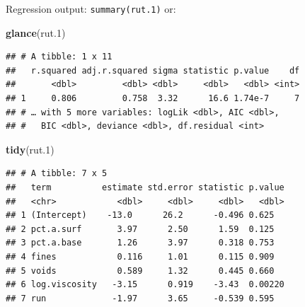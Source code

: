 \documentclass[ignorenonframetext,]{beamer}
\newenvironment{Shaded}{\begin{snugshade}}{\end{snugshade}}
\newcommand{\FloatTok}[1]{\textcolor[rgb]{0.00,0.00,0.81}{#1}}
\newcommand{\KeywordTok}[1]{\textcolor[rgb]{0.13,0.29,0.53}{\textbf{#1}}}
\newcommand{\NormalTok}[1]{#1}
\begin{document}
\begin{frame}[fragile]{Regression output: \texttt{summary(rut.1)} or:}
\protect\hypertarget{regression-output-summaryrut.1-or}{}

\footnotesize

\begin{Shaded}
\begin{Highlighting}[]
\KeywordTok{glance}\NormalTok{(rut}\FloatTok{.1}\NormalTok{)}
\end{Highlighting}
\end{Shaded}

\begin{verbatim}
## # A tibble: 1 x 11
##   r.squared adj.r.squared sigma statistic p.value    df
##       <dbl>         <dbl> <dbl>     <dbl>   <dbl> <int>
## 1     0.806         0.758  3.32      16.6 1.74e-7     7
## # … with 5 more variables: logLik <dbl>, AIC <dbl>,
## #   BIC <dbl>, deviance <dbl>, df.residual <int>
\end{verbatim}

\begin{Shaded}
\begin{Highlighting}[]
\KeywordTok{tidy}\NormalTok{(rut}\FloatTok{.1}\NormalTok{)}
\end{Highlighting}
\end{Shaded}

\begin{verbatim}
## # A tibble: 7 x 5
##   term          estimate std.error statistic p.value
##   <chr>            <dbl>     <dbl>     <dbl>   <dbl>
## 1 (Intercept)    -13.0      26.2      -0.496 0.625  
## 2 pct.a.surf       3.97      2.50      1.59  0.125  
## 3 pct.a.base       1.26      3.97      0.318 0.753  
## 4 fines            0.116     1.01      0.115 0.909  
## 5 voids            0.589     1.32      0.445 0.660  
## 6 log.viscosity   -3.15      0.919    -3.43  0.00220
## 7 run             -1.97      3.65     -0.539 0.595
\end{verbatim}

\normalsize

\end{frame}
\end{document}
